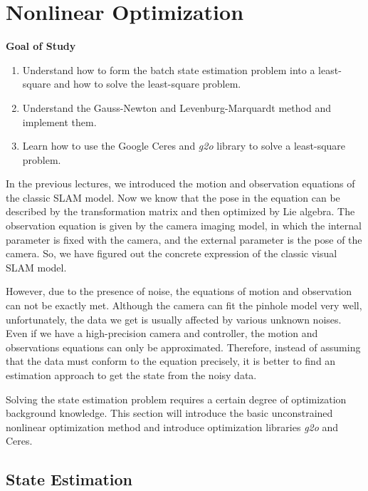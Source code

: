 \chapter{Nonlinear Optimization}
\label{cpt:6}
\begin{mdframed}  
	\textbf{Goal of Study}
	\begin{enumerate}[labelindent=0em,leftmargin=1.5em]
		\item Understand how to form the batch state estimation problem into a least-square and how to solve the least-square problem.
		\item Understand the Gauss-Newton and Levenburg-Marquardt method and implement them.
		\item Learn how to use the Google Ceres and \textit{g2o} library to solve a least-square problem.
	\end{enumerate}
\end{mdframed} 

In the previous lectures, we introduced the motion and observation equations of the classic SLAM model. Now we know that the pose in the equation can be described by the transformation matrix and then optimized by Lie algebra. The observation equation is given by the camera imaging model, in which the internal parameter is fixed with the camera, and the external parameter is the pose of the camera. So, we have figured out the concrete expression of the classic visual SLAM model.

However, due to the presence of noise, the equations of motion and observation can not be exactly met. Although the camera can fit the pinhole model very well, unfortunately, the data we get is usually affected by various unknown noises. Even if we have a high-precision camera and controller, the motion and observations equations can only be approximated. Therefore, instead of assuming that the data must conform to the equation precisely, it is better to find an estimation approach to get the state from the noisy data.

Solving the state estimation problem requires a certain degree of optimization background knowledge. This section will introduce the basic unconstrained nonlinear optimization method and introduce optimization libraries \textit{g2o} and Ceres.

%

\newpage
\section{State Estimation}
